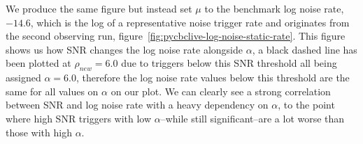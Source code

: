%
We produce the same figure but instead set $\mu$ to the benchmark log noise rate, $-14.6$, which is the log of a representative noise trigger rate and originates from the second observing run, figure~\ref{fig:pycbclive-log-noise-static-rate}. This figure shows us how SNR changes the log noise rate alongside $\alpha$, a black dashed line has been plotted at $\rho_{new} = 6.0$ due to triggers below this SNR threshold all being assigned $\alpha = 6.0$, therefore the log noise rate values below this threshold are the same for all values on $\alpha$ on our plot. We can clearly see a strong correlation between SNR and log noise rate with a heavy dependency on $\alpha$, to the point where high SNR triggers with low $\alpha$--while still significant--are a lot worse than those with high $\alpha$.


